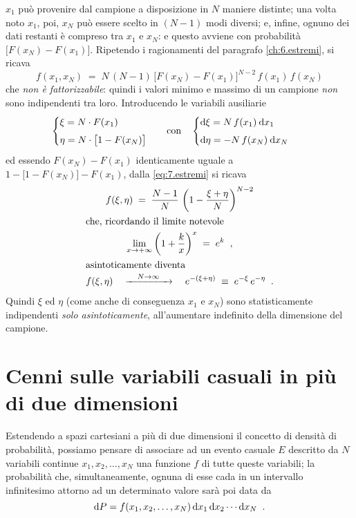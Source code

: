$x_1$ pu\`o provenire dal campione a disposizione in $N$
maniere distinte; una volta noto $x_1$, poi, $x_N$ pu\`o
essere scelto in $(N-1)$ modi diversi; e, infine, ognuno dei
dati restanti \`e compreso tra $x_1$ e $x_N$: e questo
avviene con probabilit\`a $\bigl[ F(x_N) - F(x_1) \bigr]$.
Ripetendo i ragionamenti del paragrafo \ref{ch:6.estremi},
si ricava
\begin{equation} \label{eq:7.estremi}
  f(x_1, x_N) \; = \; N \, (N - 1) \, \bigl[ F(x_N) - F(x_1)
  \bigr]^{N - 2} \, f(x_1) \, f(x_N)
\end{equation}
che \emph{non \`e fattorizzabile}: quindi i valori minimo e
massimo di un campione \emph{non} sono indipendenti tra
loro.  Introducendo le variabili ausiliarie
\begin{align*}
  &\begin{cases}
    \displaystyle \xi = N \cdot F(x_1) \\[1ex]
    \displaystyle \eta = N \cdot \bigl[ 1 - F(x_N) \bigr]
  \end{cases}
  &&\text{con}
  &&\begin{cases}
    \displaystyle \mathrm{d} \xi = N \, f(x_1) \: \mathrm{d} x_1
    \\[1ex]
    \displaystyle \mathrm{d} \eta = - N \, f(x_N) \: \mathrm{d} x_N
  \end{cases}
\end{align*}
ed essendo $F(x_N) - F(x_1)$ identicamente uguale a $1 -
\bigl[ 1 - F(x_N) \bigr] - F(x_1)$, dalla
\eqref{eq:7.estremi} si ricava
\begin{gather*}
  f(\xi, \eta) \; = \; \frac{N-1}{N} \, \left( 1 -
    \frac{\xi + \eta}{N} \right)^{N - 2} \\
  \intertext{che, ricordando il limite notevole}
  \lim_{x \to +\infty} \left( 1 + \frac{k}{x} \right)^x \; =
  \; e^k \;\; , \\
  \intertext{asintoticamente diventa}
  f(\xi, \eta) \quad \xrightarrow{\quad N \to \infty \quad}
  \quad e^{- \left( \xi + \eta \right)} \; \equiv \; e^{-
    \xi} \, e^{- \eta} \;\; .
\end{gather*}
Quindi $\xi$ ed $\eta$ (come anche di conseguenza $x_1$ e
$x_N$) sono statisticamente indipendenti \emph{solo
  asintoticamente}, all'aumentare indefinito della
dimensione del campione.%

\section{Cenni sulle variabili casuali in pi\`u di due
  dimensioni}%
Estendendo a spazi cartesiani a pi\`u di due dimensioni il
concetto di densit\`a di probabilit\`a, possiamo pensare di
associare ad un evento casuale $E$ descritto da $N$
variabili continue $x_1, x_2, \ldots, x_N$ una funzione $f$
di tutte queste variabili; la probabilit\`a che,
simultaneamente, ognuna di esse cada in un intervallo
infinitesimo attorno ad un determinato valore sar\`a poi
data da
\begin{equation*}
  \de P = f(x_1, x_2,\ldots, x_N) \, \de x_1 \, \de x_2
    \cdots \de x_N \peq .
\end{equation*}%

